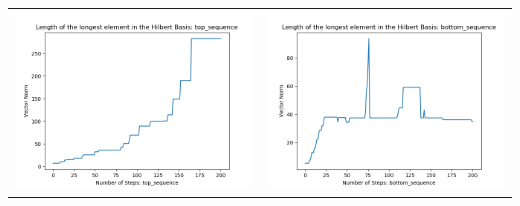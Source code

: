 \documentclass[10pt]{article}
\begin{document}
\begin{tabular}{c|c}
\begin{minipage}{.4\textwidth}
\includegraphics[width=\textwidth]{"DATA/5d/5 generators 2 bound F/top_sequence LENGTH"}
\end{minipage} &
\begin{minipage}{.4\textwidth}
\includegraphics[width=\textwidth]{"DATA/5d/5 generators 2 bound F bottomup/bottom_sequence LENGTH"}
\end{minipage}
\end{tabular}
\end{document}
